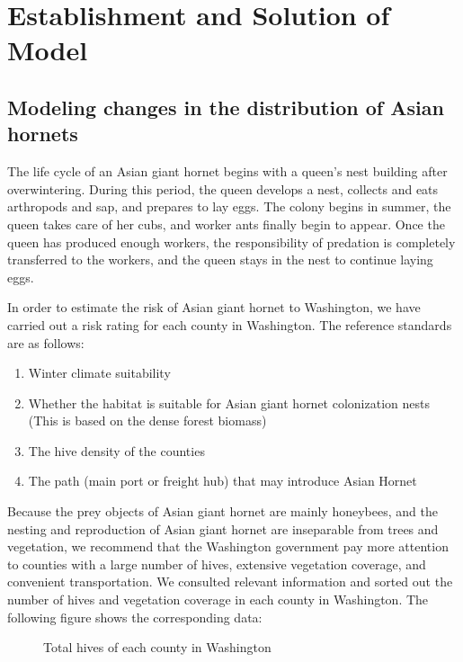 \documentclass{mcmthesis}
\numberwithin{figure}{section}
\numberwithin{table}{section}
\begin{document}
\section{Establishment and Solution of Model}
\subsection{Modeling changes in the distribution of Asian hornets}

The life cycle of an Asian giant hornet begins with a queen’s nest building after overwintering. During this period, the queen develops a nest, collects and eats arthropods and sap, and prepares to lay eggs. The colony begins in summer, the queen takes care of her cubs, and worker ants finally begin to appear. Once the queen has produced enough workers, the responsibility of predation is completely transferred to the workers, and the queen stays in the nest to continue laying eggs.


In order to estimate the risk of Asian giant hornet to Washington, we have carried out a risk rating for each county in Washington. The reference standards are as follows: 
\begin{enumerate}
  \item Winter climate suitability
  \item Whether the habitat is suitable for Asian giant hornet colonization nests (This is based on the dense forest biomass)
  \item The hive density of the counties
  \item The path (main port or freight hub) that may introduce Asian Hornet
\end{enumerate}

Because the prey objects of Asian giant hornet are mainly honeybees, and the nesting and reproduction of Asian giant hornet are inseparable from trees and vegetation, we recommend that the Washington government pay more attention to counties with a large number of hives, extensive vegetation coverage, and convenient transportation. We consulted relevant information \cite{REF1} and sorted out the number of hives and vegetation coverage in each county in Washington. The following figure shows the corresponding data:



\begin{figure}[H]
  \caption{Total hives of each county in Washington}\label{1_1}
\end{figure}
\end{document}
